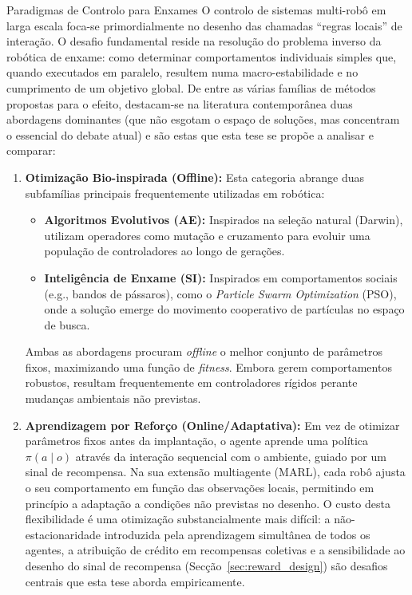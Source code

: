 \documentclass[12pt,reqno, twoside]{amsbook}
\makeatletter
\def\section{\@startsection{section}{1}%
      \z@{.5\linespacing\@plus.7\linespacing}{.25\linespacing}%
      {\normalfont\bfseries\flushleft}}
\theoremstyle{plain}
\numberwithin{equation}{chapter}
\numberwithin{section}{chapter}
\numberwithin{table}{chapter}
\numberwithin{figure}{chapter}
\makeatother
\begin{document}
\section{Paradigmas de Controlo para Enxames}
O controlo de sistemas multi-robô em larga escala foca-se primordialmente no desenho das chamadas ``regras locais'' de interação. O desafio fundamental reside na resolução do problema inverso da robótica de enxame: como determinar comportamentos individuais simples que, quando executados em paralelo, resultem numa macro-estabilidade e no cumprimento de um objetivo global. De entre as várias famílias de métodos propostas para o efeito, destacam-se na literatura contemporânea duas abordagens dominantes \cite{majid2023deep, kegeleirs2025towards, bredeche2022social} (que não esgotam o espaço de soluções, mas concentram o essencial do debate atual) e são estas que esta tese se propõe a analisar e comparar:

\begin{enumerate}
    \item \textbf{Otimização Bio-inspirada (Offline):} Esta categoria abrange duas subfamílias principais frequentemente utilizadas em robótica:
    \begin{itemize}
        \item \textbf{Algoritmos Evolutivos (AE):} Inspirados na seleção natural (Darwin), utilizam operadores como mutação e cruzamento para evoluir uma população de controladores ao longo de gerações.
        \item \textbf{Inteligência de Enxame (SI):} Inspirados em comportamentos sociais (e.g., bandos de pássaros), como o \textit{Particle Swarm Optimization} (PSO), onde a solução emerge do movimento cooperativo de partículas no espaço de busca.
    \end{itemize}
    Ambas as abordagens procuram \textit{offline} o melhor conjunto de parâmetros fixos, maximizando uma função de \textit{fitness}. Embora gerem comportamentos robustos, resultam frequentemente em controladores rígidos perante mudanças ambientais não previstas.

    \item \textbf{Aprendizagem por Reforço (Online/Adaptativa):} Em vez de otimizar parâmetros fixos antes da implantação, o agente aprende uma política $\pi(a \mid o)$ através da interação sequencial com o ambiente, guiado por um sinal de recompensa. Na sua extensão multiagente (MARL), cada robô ajusta o seu comportamento em função das observações locais, permitindo em princípio a adaptação a condições não previstas no desenho. O custo desta flexibilidade é uma otimização substancialmente mais difícil: a não-estacionaridade introduzida pela aprendizagem simultânea de todos os agentes, a atribuição de crédito em recompensas coletivas e a sensibilidade ao desenho do sinal de recompensa (Secção~\ref{sec:reward_design}) são desafios centrais que esta tese aborda empiricamente.
\end{enumerate}
\end{document}
